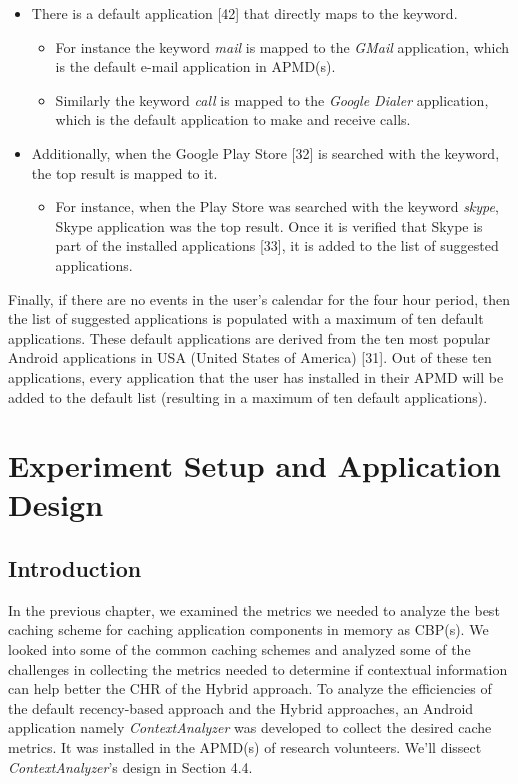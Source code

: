\documentclass[12pt]{uthesis-v12}  %
\begin{document}
			\begin{itemize}
				
				\item There is a default application [42] that directly maps to the keyword.
					
					\begin{itemize}
						\item For instance the keyword {\em mail} is mapped to the {\em GMail} application, which is the default e-mail application in APMD(s).
						\item Similarly the keyword {\em call} is mapped to the {\em Google Dialer} application, which is the default application to make and receive calls.
					\end{itemize}
				
				\item Additionally, when the Google Play Store [32] is searched with the keyword, the top result is mapped to it.
					
					\begin{itemize}
						\item  For instance, when the Play Store was searched with the keyword {\em skype}, Skype application was the top result. Once it is verified that Skype is part of the installed applications [33], it is added to the list of suggested applications.
					\end{itemize}
					
			\end{itemize}

			Finally, if there are no events in the user's calendar for the four hour period, then the list of suggested applications is populated with a maximum of ten default applications. These default applications are derived from the ten most popular Android applications in USA (United States of America) [31]. Out of these ten applications, every application that the user has installed in their APMD will be added to the default list (resulting in a maximum of ten default applications).

\chapter{Experiment Setup and Application Design}
	
	\section{Introduction}
		In the previous chapter, we examined the metrics we needed to analyze the best caching scheme for caching application components in memory as CBP(s). We looked into some of the common caching schemes and analyzed some of the challenges in collecting the metrics needed to determine if contextual information can help better the CHR of the Hybrid approach. To analyze the efficiencies of the default recency-based approach and the Hybrid approaches, an Android application namely {\em ContextAnalyzer} was developed to collect the desired cache metrics. It was installed in the APMD(s) of research volunteers. We'll dissect {\em ContextAnalyzer}'s design in Section 4.4.  
		
\end{document}
